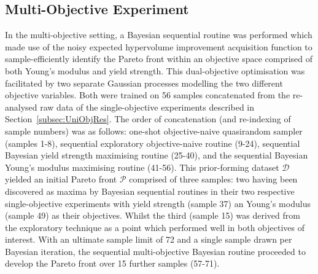 \subsection{Multi-Objective Experiment}
\label{subsec:MultiObjRes}
In the multi-objective setting, a Bayesian sequential routine was performed
 which made use of the noisy expected hypervolume improvement acquisition
 function to sample-efficiently identify the Pareto front within an objective
 space comprised of both Young's modulus and yield strength.
This dual-objective optimisation was facilitated by two separate Gaussian
 processes modelling the two different objective variables.
Both were trained on 56 samples concatenated from the re-analysed raw data 
 of the single-objective experiments described in Section~\ref{subsec:UniObjRes}.
The order of concatenation (and re-indexing of sample numbers) was as
 follows: one-shot objective-naive quasirandom sampler (samples 1-8),
 sequential exploratory objective-naive routine (9-24), sequential Bayesian
 yield strength maximising routine (25-40), and the sequential Bayesian
 Young's modulus maximising routine (41-56).
This prior-forming dataset \(\mathcal{D}\) yielded an initial Pareto front
 \(\mathcal{P}\) comprised of three samples: two having been discovered
 as maxima by Bayesian sequential routines in their two respective
 single-objective experiments with yield strength (sample 37) an
 Young's modulus (sample 49) as their objectives.
Whilst the third (sample 15) was derived from the exploratory technique as a
 point which performed well in both objectives of interest.
With an ultimate sample limit of 72 and a single sample drawn per Bayesian
 iteration, the sequential multi-objective Bayesian routine proceeded to
 develop the Pareto front over 15 further samples (57-71).

